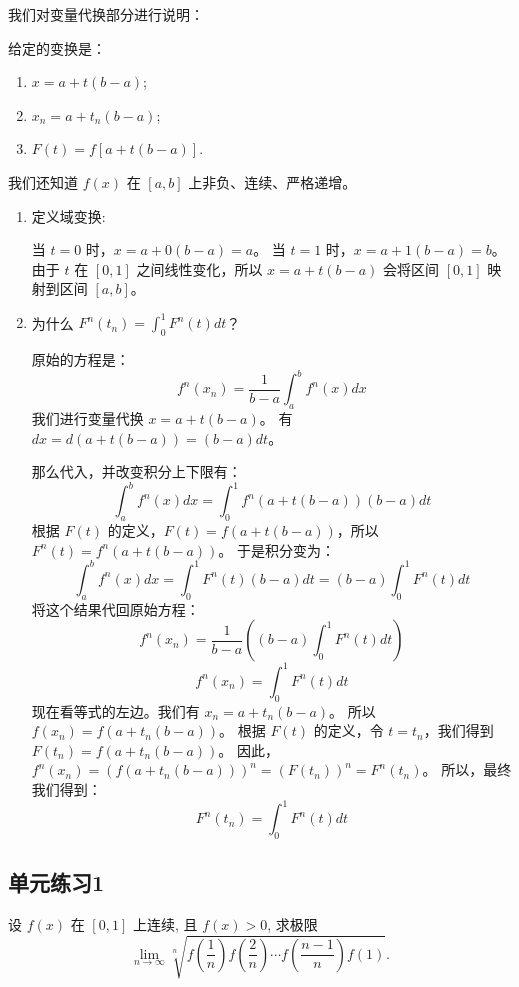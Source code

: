 \documentclass[lang=cn,newtx,10pt,scheme=chinese]{elegantbook}
\begin{document}
\begin{remark}
    我们对变量代换部分进行说明：

    给定的变换是：
    \begin{enumerate}
        \item $x = a + t(b-a)$;
        \item $x_n = a + t_n(b-a)$;
        \item $F(t) = f[a+t(b-a)]$.
    \end{enumerate}

    我们还知道 $f(x)$ 在 $[a,b]$ 上非负、连续、严格递增。

    \begin{enumerate}
        \item   定义域变换:

                    当 $t=0$ 时，$x = a + 0(b-a) = a$。
                    当 $t=1$ 时，$x = a + 1(b-a) = b$。
                    由于 $t$ 在 $[0,1]$ 之间线性变化，所以 $x = a+t(b-a)$ 会将区间 $[0,1]$ 映射到区间 $[a,b]$。

        \item   为什么 $F^n(t_n) = \int_0^1 F^n(t) dt$？

        原始的方程是：
        $$f^n(x_n) = \frac{1}{b-a} \int_a^b f^n(x) dx$$
        我们进行变量代换 $x = a + t(b-a)$。
        有 $dx = d(a+t(b-a)) = (b-a)dt$。

        那么代入，并改变积分上下限有：
        $$\int_a^b f^n(x) dx = \int_0^1 f^n(a+t(b-a)) (b-a) dt$$
        根据 $F(t)$ 的定义，$F(t) = f(a+t(b-a))$，所以 $F^n(t) = f^n(a+t(b-a))$。
        于是积分变为：
        $$\int_a^b f^n(x) dx = \int_0^1 F^n(t) (b-a) dt = (b-a) \int_0^1 F^n(t) dt$$
        将这个结果代回原始方程：
        $$f^n(x_n) = \frac{1}{b-a} \left( (b-a) \int_0^1 F^n(t) dt \right)$$
        $$f^n(x_n) = \int_0^1 F^n(t) dt$$
        现在看等式的左边。我们有 $x_n = a + t_n(b-a)$。
        所以 $f(x_n) = f(a+t_n(b-a))$。
        根据 $F(t)$ 的定义，令 $t=t_n$，我们得到 $F(t_n) = f(a+t_n(b-a))$。
        因此，$f^n(x_n) = (f(a+t_n(b-a)))^n = (F(t_n))^n = F^n(t_n)$。
        所以，最终我们得到：
        $$F^n(t_n) = \int_0^1 F^n(t) dt$$
    \end{enumerate}
\end{remark}

\subsection{单元练习1}
\begin{problem}[$\bigstar$]
设 $f(x)$ 在 $[0,1]$ 上连续, 且 $f(x) > 0$, 求极限
$$ \lim_{n \to \infty} \sqrt[n]{f\left(\frac{1}{n}\right)f\left(\frac{2}{n}\right)\cdots f\left(\frac{n-1}{n}\right)f(1)}. $$
\end{problem}
\end{document}
